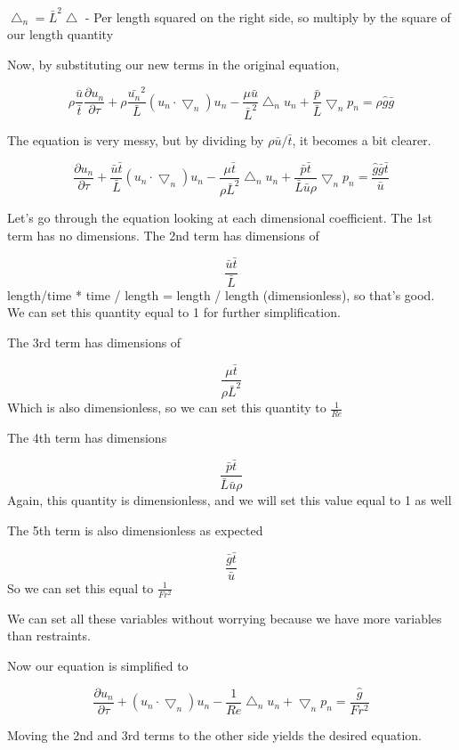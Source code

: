 \documentclass{article}
\begin{document}
$ \bigtriangleup_n = \bar{L}^2  \bigtriangleup$ - Per length squared on the right side, so multiply by the square of our length quantity

Now, by substituting our new terms in the original equation, 

$$\rho \frac{\bar{u}}{\bar{t}} \frac{\partial u_n}{\partial \tau} + \rho \frac{\bar{u_n}^2 }{\bar{L}} (u_n \cdot \bigtriangledown_n ) u_n - \frac{\mu \bar{u}}{\bar{L}^2} \bigtriangleup_n u_n + \frac{\bar{p}}{\bar{L}}\bigtriangledown_n p_n = \rho \hat{g} \bar{g}$$

The equation is very messy, but by dividing by  $\rho {\bar{u}}/{\bar{t}}$, it becomes a bit clearer.

$$ \frac{\partial u_n}{\partial \tau} + \frac{\bar{u}\bar{t}}{\bar{L}} (u_n \cdot \bigtriangledown_n ) u_n - \frac{\mu \bar{t}}{\rho \bar{L}^2} \bigtriangleup_n u_n + \frac{\bar{p} \bar{t}}{\bar{L}\bar{u} \rho}\bigtriangledown_n p_n = \frac{\hat{g} \bar{g} \bar{t}}{\bar{u}}$$


Let's go through the equation looking at each dimensional coefficient. The 1st term has no dimensions. The 2nd term has dimensions of

$$\frac{\bar{u}\bar{t}}{\bar{L}}$$  length/time * time / length = length / length (dimensionless), so that's good. We can set this quantity equal to 1 for further simplification. 

The 3rd term has dimensions of

$$\frac{\mu \bar{t}}{\rho \bar{L}^2} $$
Which is also dimensionless, so we can set this quantity to $\frac{1}{Re}$

The 4th term has dimensions 

$$\frac{\bar{p} \bar{t}}{\bar{L}\bar{u} \rho} $$
Again, this quantity is dimensionless, and we will set this value equal to 1 as well

The 5th term is also dimensionless as expected

$$\frac{\bar{g} \bar{t}}{\bar{u}}$$
So we can set this equal to $\frac{1}{Fr^2}$

We can set all these variables without worrying because we have more variables than restraints.

Now our equation is simplified to 

$$ \frac{\partial u_n}{\partial \tau} + (u_n \cdot \bigtriangledown_n ) u_n - \frac{1}{Re} \bigtriangleup_n u_n + \bigtriangledown_n p_n = \frac{\hat{g}}{Fr^2}$$

Moving the 2nd and 3rd terms to the other side yields the desired equation. 
\end{document}
